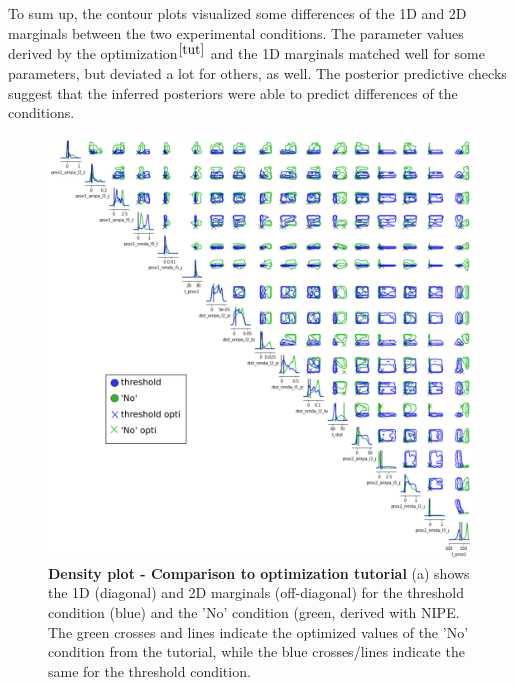 \documentclass[12pt]{extreport}
\begin{document}
To sum up, the contour plots visualized some differences of the 1D and 2D marginals between the two experimental conditions. The parameter values derived by the optimization$^{\ref{tut} }$ and the 1D marginals matched well for some parameters, but deviated a lot for others, as well. The posterior predictive checks suggest that the inferred posteriors were able to predict differences of the conditions.






 \begin{figure}[!ht]
 \centering


        \includegraphics[width=0.99\linewidth]{images/contour_plots_threshold_versus_no_green_blue4.png}
        


\caption{\label{contour_opti}\textbf{Density plot - Comparison to optimization tutorial} \small (a) shows the 1D (diagonal) and 2D marginals (off-diagonal) for the threshold condition (blue) and the 'No' condition (green, derived with NIPE. The green crosses and lines indicate the optimized values of the 'No' condition from the tutorial, while the blue crosses/lines indicate the same for the threshold condition.}

\end{figure}
\end{document}
